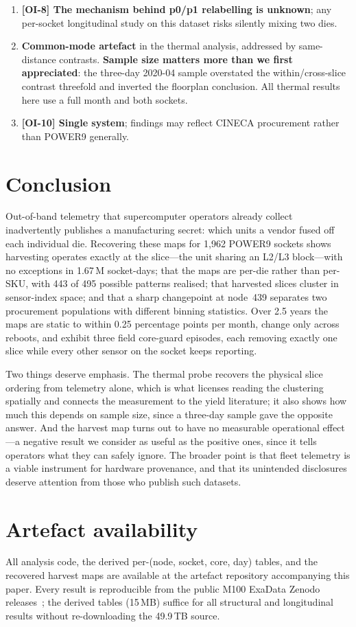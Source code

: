 \documentclass[10pt,conference]{IEEEtran}
\begin{document}
\begin{enumerate}
\item \textbf{[OI-8] The mechanism behind p0/p1 relabelling is unknown}; any per-socket
longitudinal study on this dataset risks silently mixing two dies.
\item \textbf{Common-mode artefact} in the thermal analysis, addressed by same-distance contrasts.
\textbf{Sample size matters more than we first appreciated}: the three-day 2020-04 sample
overstated the within/cross-slice contrast threefold and inverted the floorplan conclusion. All
thermal results here use a full month and both sockets.
\item \textbf{[OI-10] Single system}; findings may reflect CINECA procurement rather than POWER9
generally.
\end{enumerate}

\section{Conclusion}
Out-of-band telemetry that supercomputer operators already collect inadvertently publishes a
manufacturing secret: which units a vendor fused off each individual die. Recovering these maps for
1{,}962 POWER9 sockets shows harvesting operates exactly at the slice---the unit sharing an L2/L3
block---with no exceptions in 1.67\,M socket-days; that the maps are per-die rather than per-SKU,
with 443 of 495 possible patterns realised; that harvested slices cluster in sensor-index space;
and that a sharp changepoint at node~439 separates two procurement populations with different
binning statistics. Over 2.5 years the maps are static to within 0.25 percentage points per month,
change only across reboots, and exhibit three field core-guard episodes, each removing exactly one
slice while every other sensor on the socket keeps reporting.

Two things deserve emphasis. The thermal probe recovers the physical slice ordering from telemetry
alone, which is what licenses reading the clustering spatially and connects the measurement to the
yield literature; it also shows how much this depends on sample size, since a three-day sample gave
the opposite answer. And the harvest map turns out to have no measurable operational effect---a
negative result we consider as useful as the positive ones, since it tells operators what they can
safely ignore.
The broader point is that fleet telemetry is a viable instrument for hardware provenance, and that
its unintended disclosures deserve attention from those who publish such datasets.

\section*{Artefact availability}
All analysis code, the derived per-(node, socket, core, day) tables, and the recovered harvest maps
are available at the artefact repository accompanying this paper. Every result is reproducible from
the public M100 ExaData Zenodo releases~\cite{borghesi2023m100}; the derived tables (15\,MB)
suffice for all structural and longitudinal results without re-downloading the 49.9\,TB source.



\end{document}
